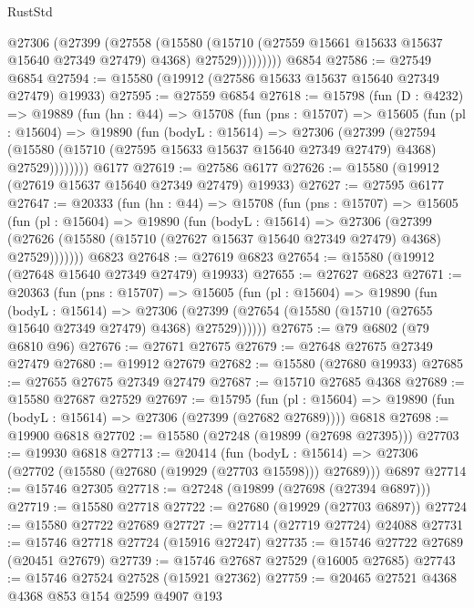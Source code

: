 \begin{lexlean}{RustStd}
\begin{coremodule}
              @27306
                (@27399
                  (@27558
                    (@15580
                      (@15710 (@27559 @15661 @15633 @15637 @15640 @27349 @27479) @4368)
                      @27529)))))))))
    @6854
@27586 := @27549 @6854
@27594 := @15580 (@19912 (@27586 @15633 @15637 @15640 @27349 @27479) @19933)
@27595 := @27559 @6854
@27618 := @15798
    (fun (D : @4232) =>
    @19889
      (fun (hn : @44) =>
      @15708
        (fun (pns : @15707) =>
        @15605
          (fun (pl : @15604) =>
          @19890
            (fun (bodyL : @15614) =>
            @27306
              (@27399
                (@27594
                  (@15580 (@15710 (@27595 @15633 @15637 @15640 @27349 @27479) @4368) @27529))))))))
    @6177
@27619 := @27586 @6177
@27626 := @15580 (@19912 (@27619 @15637 @15640 @27349 @27479) @19933)
@27627 := @27595 @6177
@27647 := @20333
    (fun (hn : @44) =>
    @15708
      (fun (pns : @15707) =>
      @15605
        (fun (pl : @15604) =>
        @19890
          (fun (bodyL : @15614) =>
          @27306
            (@27399
              (@27626 (@15580 (@15710 (@27627 @15637 @15640 @27349 @27479) @4368) @27529)))))))
    @6823
@27648 := @27619 @6823
@27654 := @15580 (@19912 (@27648 @15640 @27349 @27479) @19933)
@27655 := @27627 @6823
@27671 := @20363
    (fun (pns : @15707) =>
    @15605
      (fun (pl : @15604) =>
      @19890
        (fun (bodyL : @15614) =>
        @27306 (@27399 (@27654 (@15580 (@15710 (@27655 @15640 @27349 @27479) @4368) @27529))))))
@27675 := @79 @6802 (@79 @6810 @96)
@27676 := @27671 @27675
@27679 := @27648 @27675 @27349 @27479
@27680 := @19912 @27679
@27682 := @15580 (@27680 @19933)
@27685 := @27655 @27675 @27349 @27479
@27687 := @15710 @27685 @4368
@27689 := @15580 @27687 @27529
@27697 := @15795
    (fun (pl : @15604) => @19890 (fun (bodyL : @15614) => @27306 (@27399 (@27682 @27689))))
    @6818
@27698 := @19900 @6818
@27702 := @15580 (@27248 (@19899 (@27698 @27395)))
@27703 := @19930 @6818
@27713 := @20414
    (fun (bodyL : @15614) => @27306 (@27702 (@15580 (@27680 (@19929 (@27703 @15598))) @27689)))
    @6897
@27714 := @15746 @27305
@27718 := @27248 (@19899 (@27698 (@27394 @6897)))
@27719 := @15580 @27718
@27722 := @27680 (@19929 (@27703 @6897))
@27724 := @15580 @27722 @27689
@27727 := @27714 (@27719 @27724) @24088
@27731 := @15746 @27718 @27724 (@15916 @27247)
@27735 := @15746 @27722 @27689 (@20451 @27679)
@27739 := @15746 @27687 @27529 (@16005 @27685)
@27743 := @15746 @27524 @27528 (@15921 @27362)
@27759 := @20465
    @27521
    @4368
    @4368
    @853
    @154
    @2599
    @4907
    @193

\end{coremodule}
\end{lexlean}
